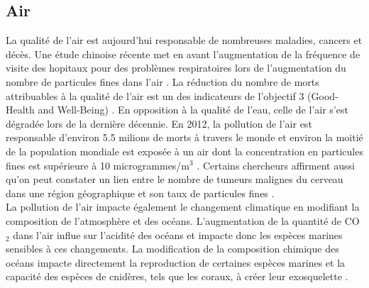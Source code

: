 \documentclass[10pt, conference, compsocconf]{llncs}
\begin{document}
		\subsection{Air}
			La qualité de l'air est aujourd'hui responsable de nombreuses maladies, cancers et décès. Une étude chinoise récente met en avant l'augmentation de la fréquence de visite des hopitaux pour des problèmes respiratoires lors de l'augmentation du nombre de particules fines dans l'air \cite{liu_effects_2016}. La réduction du nombre de morts attribuables à la qualité de l'air est un des indicateurs de l'objectif 3 (Good-Health and Well-Being) \cite{united_nations_goal_nodate-5}. En opposition à la qualité de l'eau, celle de l'air s'est dégradée lors de la dernière décennie. En 2012, la pollution de l'air est responsable d'environ 5.5 milions de morts à travers le monde et environ la moitié de la population mondiale est exposée à un air dont la concentration en particules fines est supérieure à 10 microgrammes/m$^{3}$ \cite{yale_university_epi_2016}. Certains chercheurs affirment aussi qu'on peut constater un lien entre le nombre de tumeurs malignes du cerveau dans une région géographique et son taux de particules fines \cite{andersen_long-term_nodate}. \\
			La pollution de l'air impacte également le changement climatique en modifiant la composition de l'atmosphère et des océans. L'augmentation de la quantité de CO$_{2}$ dans l'air influe sur l'acidité des océans et impacte donc les espèces marines sensibles à ces changements. La modification de la composition chimique des océans impacte directement la reproduction de certaines espèces marines et la capacité des espèces de cnidères, tels que les coraux, à créer leur exosquelette \cite{hoegh-guldberg_coral_2007}.  \\		
		
\end{document}

